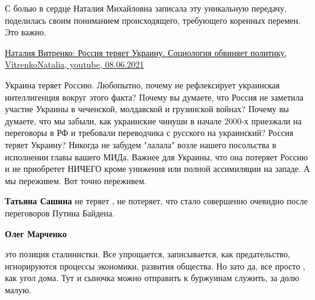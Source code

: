 \begin{itemize}
{С болью в сердце Наталия Михайловна записала эту уникальную передачу,
поделилась своим пониманием происходящего, требующего коренных перемен. Это
важно.
}

\href{https://www.youtube.com/watch?v=WKYrF0oLCm8}{%
Наталия Витренко: Россия теряет Украину. Социология обвиняет политику, %
VitrenkoNatalia, youtube, 08.06.2021%
}

\begin{itemize}
 

Украина теряет Россию. Любопытно, почему не рефлексирует украинская
интеллигенция вокруг этого факта? Почему вы думаете, что Россия не заметила
участие Украины в чеченской, молдавской и грузинской войнах? Почему вы думаете,
что мы забыли, как украинские чинуши в начале 2000-х приезжали на переговоры в
РФ и требовали переводчика с русского на украинский? Россия теряет Украину?
Никогда не забудем "лалала" возле нашего посольства в исполнении главы вашего
МИДа. Важнее для Украины, что она потеряет Россию и не приобретет НИЧЕГО кроме
унижения или полной ассимиляции на западе. А мы переживем. Вот точно переживем.


 
\textbf{Татьяна Сашина} не теряет , не потеряет, что стало совершенно очевидно после переговоров Путина Байдена.

 
\textbf{Олег Марченко} 

это позиция сталинистки. Все упрощается, записывается, как предательство,
игнорируются процессы экономики, развития общества. Но зато да, все просто ,
как угол дома. Тут и сыночка можно отправить к буржуинам служить, за долю
малую.

 

\end{itemize}
\end{itemize}
